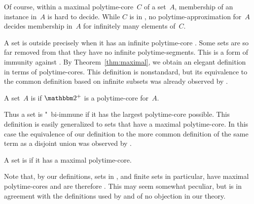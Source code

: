 Of course, within a maximal polytime-core~$C$ of a set~$A$, membership of an instance in~$A$ is hard to decide.
While $C$ is in , no polytime-approximation for~$A$ decides membership in~$A$ for infinitely many elements of~$C$.

A set is outside  precisely when it has an infinite polytime-core \parencite{lynch1975reducibility}.
Some sets are so far removed from  that they have no infinite polytime-segments.
This is a form of immunity against .
By Theorem~\ref{thm:maximal}, we obtain an elegant definition in terms of polytime-cores.
This definition is nonstandard, but its equivalence to the common definition based on infinite subsets was already observed by \textcite{balcazar1985bi-immune} \parencite[see also][]{book1988polynomial}.
\begin{definition}
  A set~$A$ is  if $\binary^+$ is a polytime-core for~$A$.
\end{definition}

Thus a set is "~bi-immune if it has the largest polytime-core possible.
This definition is easily generalized to sets that have a maximal polytime-core.
In this case the equivalence of our definition to the more common definition of the same term as a disjoint union was observed by \textcite{orponen1986classification}.
\begin{definition}
  A set is  if it has a maximal polytime-core.
\end{definition}
Note that, by our definitions, sets in , and finite sets in particular, have maximal polytime-cores and are therefore .
This may seem somewhat peculiar, but is in agreement with the definitions used by \textcite{orponen1986classification} and of no objection in our theory.

